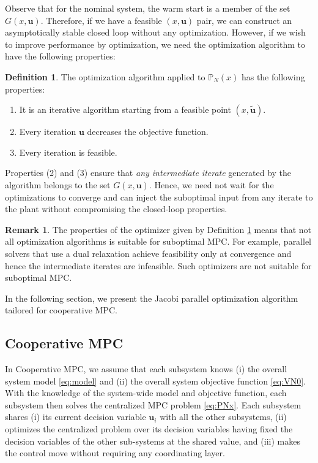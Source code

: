 \documentclass[10pt]{article}
\newcommand{\bu}{\mathbf{u}}
\theoremstyle{definition}
\newtheorem{definition}[assumption]{Definition}
\newtheorem{remark}[assumption]{Remark}
\begin{document}
Observe that for the nominal system, the warm start is a member of the
set $G(x,\bu)$.  Therefore, if we have a feasible $(x,\bu)$ pair, we
can construct an asymptotically stable closed loop without any
optimization.  However, if we wish to improve performance by
optimization, we need the optimization algorithm to have the
following properties: 
\begin{definition}
\label{thm:propO}
The optimization algorithm applied to $\mathbb{P}_N(x)$ has the following properties:
\begin{enumerate}
\item It is an iterative algorithm starting from a feasible point $(x,\tilde{\bu})$.
\item Every iteration $\bu$ decreases the objective function. 
\item Every iteration is feasible.
\end{enumerate}
\end{definition}
Properties (2) and (3) ensure that {\em{any intermediate iterate}}
generated by the algorithm  belongs to the set
$G(x,\bu)$. Hence, we need not  wait for the optimizations to converge
and can inject the suboptimal input from any iterate to the plant
without compromising the closed-loop properties.


\begin{remark} The properties of the optimizer given by Definition
\ref{thm:propO} means that not all optimization algorithms is suitable
for suboptimal MPC. For example, parallel solvers that use a dual
relaxation achieve feasibility only at convergence and hence
the intermediate iterates are infeasible. Such optimizers are not
suitable for suboptimal MPC.
\end{remark}

In the following section, we present the
Jacobi parallel optimization algorithm tailored for cooperative MPC.

\subsection{Cooperative MPC}
In Cooperative MPC, we assume that each subsystem knows (i) the
overall system model \eqref{eq:model} and (ii) the overall system
objective function \eqref{eq:VN0}. With the knowledge of the system-wide model and objective
function, each subsystem then solves the centralized
MPC problem \eqref{eq:PNx}. Each subsystem shares (i) its current
decision variable $\bu_i$ with all the other subsystems, (ii)
optimizes the centralized problem over its decision variables having
fixed the decision variables of the other sub-systems at the shared
value, and (iii) makes the control move without requiring any
coordinating layer.
\end{document}
